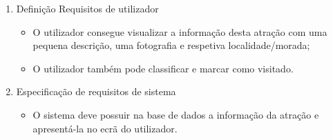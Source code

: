\begin{enumerate}
    \item Definição Requisitos de utilizador
    \begin{itemize}
        \item O utilizador consegue visualizar a informação desta atração com uma pequena descrição, uma fotografia e respetiva localidade/morada;
        \item O utilizador também pode classificar e marcar como visitado.
    \end{itemize}
    \item Especificação de requisitos de sistema
    \begin{itemize}
        \item O sistema deve possuir na base de dados a informação da atração e apresentá-la no ecrã do utilizador.
    \end{itemize}
\end{enumerate}